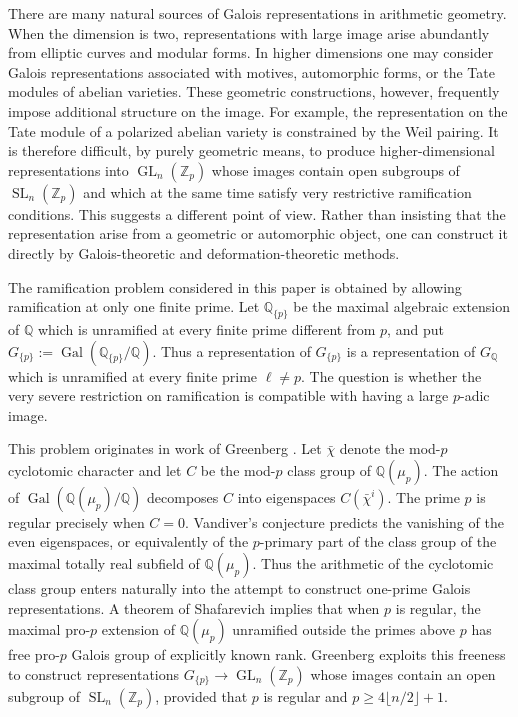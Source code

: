 \documentclass[11pt]{amsart}
\numberwithin{equation}{section}
\newcommand{\Q}{\mathbb Q}
\newcommand{\Zp}{\mathbb Z_p}
\newcommand{\Gal}{\operatorname{Gal}}
\newcommand{\SL}{\operatorname{SL}}
\newcommand{\GL}{\operatorname{GL}}
\theoremstyle{definition}
\begin{document}
\par There are many natural sources of Galois representations in arithmetic
geometry. When the dimension is two, representations with large image
arise abundantly from elliptic curves and modular forms. In higher
dimensions one may consider Galois representations associated with
motives, automorphic forms, or the Tate modules of abelian varieties.
These geometric constructions, however, frequently impose additional
structure on the image. For example, the representation on the Tate
module of a polarized abelian variety is constrained by the Weil
pairing. It is therefore difficult, by purely geometric means, to
produce higher-dimensional representations into $\GL_n(\Zp)$ whose
images contain open subgroups of $\SL_n(\Zp)$ and which at the same
time satisfy very restrictive ramification conditions. This suggests
a different point of view. Rather than insisting that the
representation arise from a geometric or automorphic object, one can
construct it directly by Galois-theoretic and deformation-theoretic
methods.

\par The ramification problem considered in this paper is obtained
by allowing ramification at only one finite prime. Let
$\Q_{\{p\}}$ be the maximal algebraic extension of $\Q$ which is
unramified at every finite prime different from $p$, and put $G_{\{p\}}
        :=
        \Gal(\Q_{\{p\}}/\Q)$. Thus a representation of $G_{\{p\}}$ is a representation of
$G_\Q$ which is unramified at every finite prime $\ell\neq p$. The
question is whether the very severe restriction on ramification is
compatible with having a large $p$-adic image.

\par This problem originates in work of Greenberg
\cite{Greenberg2016}. Let
$\bar\chi$ denote the mod-$p$ cyclotomic character and let $C$ be the
mod-$p$ class group of $\Q(\mu_p)$. The action of
$\Gal(\Q(\mu_p)/\Q)$ decomposes $C$ into eigenspaces
$C(\bar\chi^i)$. The prime $p$ is regular precisely when $C=0$.
Vandiver's conjecture predicts the vanishing of the even eigenspaces,
or equivalently of the $p$-primary part of the class group of the
maximal totally real subfield of $\Q(\mu_p)$. Thus the arithmetic of
the cyclotomic class group enters naturally into the attempt to
construct one-prime Galois representations. A theorem of Shafarevich
implies that when $p$ is regular, the maximal pro-$p$ extension of
$\Q(\mu_p)$ unramified outside the primes above $p$ has free pro-$p$ Galois
group of explicitly known rank. Greenberg exploits this freeness to
construct representations $G_{\{p\}}\longrightarrow\GL_n(\Zp)$
whose images contain an open subgroup of $\SL_n(\Zp)$, provided that
$p$ is regular and 
$p\geq4\lfloor n/2\rfloor+1$.
\end{document}
